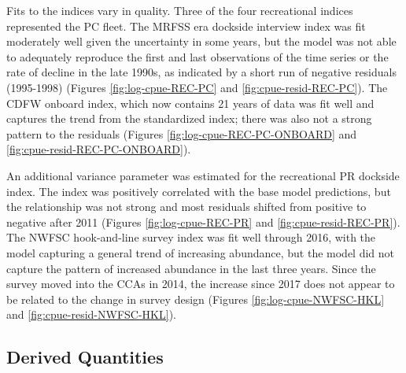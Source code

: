 \documentclass[11pt,
  english,
  a4paper,
]{article}
\begin{document}
\tagstructend

Fits to the indices vary in quality. Three of the four recreational indices represented the PC fleet. The MRFSS era dockside interview index was fit moderately well given the uncertainty in some years, but the model was not able to adequately reproduce the first and last observations of the time series or the rate of decline in the late 1990s, as indicated by a short run of negative residuals (1995-1998) (Figures \ref{fig:log-cpue-REC-PC} and \ref{fig:cpue-resid-REC-PC}). The CDFW onboard index, which now contains 21 years of data was fit well and captures the trend from the standardized index; there was also not a strong pattern to the residuals (Figures \ref{fig:log-cpue-REC-PC-ONBOARD} and \ref{fig:cpue-resid-REC-PC-ONBOARD}).

An additional variance parameter was estimated for the recreational PR dockside index. The index was positively correlated with the base model predictions, but the relationship was not strong and most residuals shifted from positive to negative after 2011 (Figures \ref{fig:log-cpue-REC-PR} and \ref{fig:cpue-resid-REC-PR}). The NWFSC hook-and-line survey index was fit well through 2016, with the model capturing a general trend of increasing abundance, but the model did not capture the pattern of increased abundance in the last three years. Since the survey moved into the CCAs in 2014, the increase since 2017 does not appear to be related to the change in survey design (Figures \ref{fig:log-cpue-NWFSC-HKL} and \ref{fig:cpue-resid-NWFSC-HKL}).


\hypertarget{derived-quantities}{%
\subsection{Derived Quantities}\label{derived-quantities}}

\leavevmode\tagmcend\tagstructend
\end{document}
